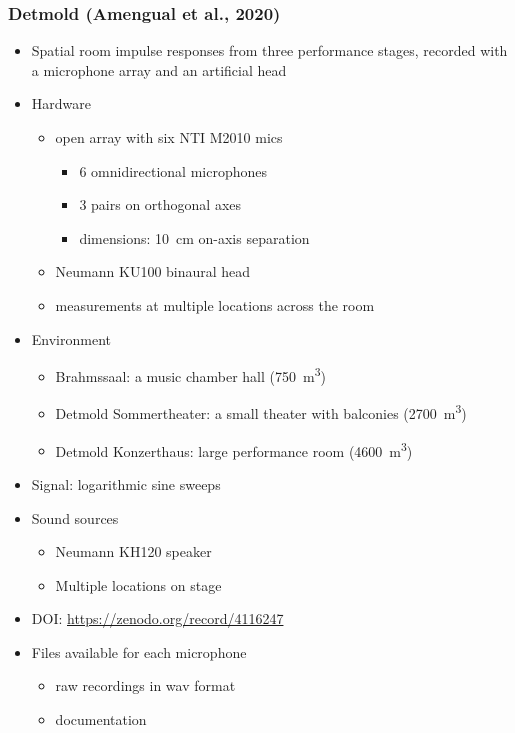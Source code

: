 \documentclass[14pt, oneside]{extarticle}
\begin{document}
\subsubsection{Detmold (Amengual et al., 2020)}

\begin{itemize}

\item Spatial room impulse responses from three performance stages, recorded with a microphone array and an artificial head \cite{amengual2020open}

\item Hardware
	\begin{itemize}
	\item open array with six NTI M2010 mics
		\begin{itemize}
		\item 6 omnidirectional microphones 
		\item 3 pairs on orthogonal axes	
		\item dimensions: \SI{10}{\centi\metre} on-axis separation
		\end{itemize}
	\item Neumann KU100 binaural head
	\item measurements at multiple locations across the room
	\end{itemize}

\item Environment
	\begin{itemize}
	\item Brahmssaal: a music chamber hall (\SI{750}{\cubic\metre})
	\item Detmold Sommertheater: a small theater with balconies (\SI{2700}{\cubic\metre})
	\item Detmold Konzerthaus: large performance room (\SI{4600}{\cubic\metre})
	\end{itemize}

\item Signal: logarithmic sine sweeps

\item Sound sources
	\begin{itemize}
	\item Neumann KH120 speaker
	\item Multiple locations on stage
	\end{itemize}

\item DOI: \href{10.5281/zenodo.4116247}{https://zenodo.org/record/4116247} 

\item Files available for each microphone
	\begin{itemize}
	\item raw recordings in wav format
	\item documentation
	\end{itemize}

\end{itemize}
\end{document}
